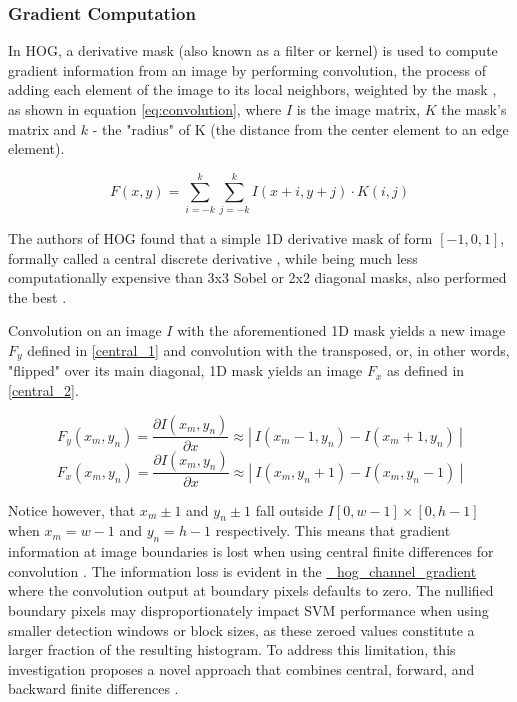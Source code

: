 \subsubsection{Gradient Computation}\label{sec:deriv_mask}

In HOG, a derivative mask (also known as a filter or kernel) is used to compute gradient information from an image \cite{dalal_2005_histograms} by performing convolution, the process of adding each element of the image to its local neighbors, weighted by the mask \cite{niebles2012edge}, as shown in equation \ref{eq:convolution}, where $I$ is the image matrix, $K$ the mask's matrix and $k$ - the "radius" of K (the distance from the center element to an edge element). 

\begin{equation}\label{eq:convolution}
    F(x,y) = \sum_{i=-k}^{k} \sum_{j=-k}^{k} I(x+i,y+j) \cdot K(i,j)
\end{equation}


The authors of HOG found that a simple 1D derivative mask of form $[-1,0,1]$, formally called a central discrete derivative \cite{niebles2012edge}, while being much less computationally expensive than 3x3 Sobel or 2x2 diagonal masks, also performed the best \cite{dalal_2005_histograms}.

Convolution on an image $I$ with the aforementioned 1D mask yields a new image $F_y$ defined in \ref{central_1} and convolution with the transposed, or, in other words, "flipped" over its main diagonal, 1D mask yields an image $F_x$ as defined in \ref{central_2}.

\begin{equation}\label{central_1}
    F_{y}(x_{m},y_{n}) = \frac{ \partial I(x_{m},y_{n}) }{ \partial x } \approx |\ I(x_{m}-1,y_{n})-I(x_{m}+1,y_{n})\ | 
\end{equation}
\begin{equation}\label{central_2}
    F_{x}(x_{m},y_{n}) = \frac{ \partial I(x_{m},y_{n}) }{ \partial x } \approx |\ I(x_{m},y_{n}+1)-I(x_{m},y_{n}-1)\ | 
\end{equation}

Notice however, that $x_m\pm 1$ and $y_n\pm 1$ fall outside $I[0,w-1]\times[0,h-1]$ when $x_m=w-1$ and $y_n=h-1$ respectively. This means that gradient information at image boundaries is lost when using central finite differences for convolution \cite{shidlovskiy_2020_reducing}. The information loss is evident in the \href{https://github.com/scikit-image/scikit-image/blob/main/skimage/feature/_hog.py}{\_hog\_channel\_gradient} where the convolution output at boundary pixels defaults to zero. The nullified boundary pixels may disproportionately impact SVM performance when using smaller detection windows or block sizes, as these zeroed values constitute a larger fraction of the resulting histogram. To address this limitation, this investigation proposes a novel approach that combines central, forward, and backward finite differences \cite{niebles2012edge}.

